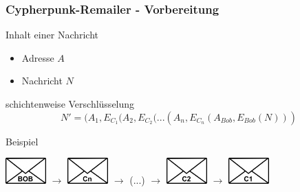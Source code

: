 \documentclass{beamer}
\begin{document}
\begin{frame}
	\frametitle{Cypherpunk-Remailer - Vorbereitung}
	\begin{block}{Inhalt einer Nachricht}	
		\begin{itemize}	
			\item Adresse \(A\)
			\item Nachricht \(N\)
		\end{itemize}	
	\end{block}	
	\begin{block}{schichtenweise Verschlüsselung}	
		\begin{equation}
			N' = (A_1, E_{C_1}(A_2, E_{C_2} (... (A_n,  E_{C_n}(A_{Bob}, E_{Bob}(N)))
		\end{equation}	
	\end{block}	

	\begin{exampleblock}{Beispiel}	
		\begin{center}
		\includegraphics[height=1cm]{bilder/nachricht_bob.jpg}
		\hspace{0.2cm}
		$\rightarrow$
		\hspace{0.2cm}
		\includegraphics[height=1cm]{bilder/nachricht_cn.jpg}
		\hspace{0.2cm}
		$\rightarrow$ (...)
		\hspace{0.2cm}
		$\rightarrow$
		\hspace{0.2cm}
		\includegraphics[height=1cm]{bilder/nachricht_c2.jpg}
		\hspace{0.2cm}
		$\rightarrow$
		\hspace{0.2cm}
		\includegraphics[height=1cm]{bilder/nachricht_c1.jpg}
		\end{center}
	\end{exampleblock}	
\end{frame}
\end{document}
